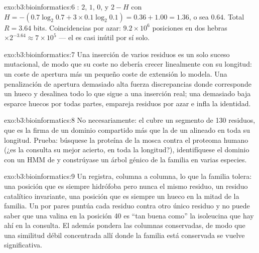 \begin{solution}{exo:b3:bioinformatics:6}
: $2$, $1$, $0$, y $2 - H$ con $H = -(0.7\log_{2}
0.7 + 3\times 0.1\log_{2} 0.1) = 0.36 + 1.00 = 1.36$, o sea $0.64$. Total
$R = 3.64$ bits. Coincidencias por azar: $9.2\times 10^{6}$ posiciones en
dos hebras $\times 2^{-3.64} \approx 7\times 10^{5}$ --- el  es
casi inútil por sí solo.
\end{solution}

\begin{solution}{exo:b3:bioinformatics:7}
Una inserción de varios residuos es un solo suceso mutacional, de modo
que su coste no debería crecer linealmente con su longitud: un coste de
apertura más un pequeño coste de extensión lo modela. Una penalización de
apertura demasiado alta fuerza discrepancias donde corresponde un hueco y
desalinea todo lo que sigue a una inserción real; una demasiado baja
esparce huecos por todas partes, empareja residuos por azar e infla la
identidad.
\end{solution}

\begin{solution}{exo:b3:bioinformatics:8}
No necesariamente: el  cubre un segmento de \num{130}
residuos, que es la firma de un dominio compartido más que la de un
 alineado en toda su longitud. Prueba: búsquese la proteína de la
mosca contra el proteoma humano (¿es la consulta su mejor acierto, en
toda la longitud?), identifíquese el dominio con un HMM de  y
constrúyase un árbol génico de la familia en varias especies.
\end{solution}

\begin{solution}{exo:b3:bioinformatics:9}
Un  registra, columna a columna, lo que la familia tolera: una
posición que es siempre hidrófoba pero nunca el mismo residuo, un residuo
catalítico invariante, una posición que es siempre un hueco en la mitad
de la familia. Un  por pares puntúa cada residuo contra otro
único residuo y no puede saber que una valina en la posición 40 es ``tan
buena como'' la isoleucina que hay ahí en la consulta. El  además
pondera las columnas conservadas, de modo que una similitud débil
concentrada allí donde la familia está conservada se vuelve significativa.
\end{solution}

